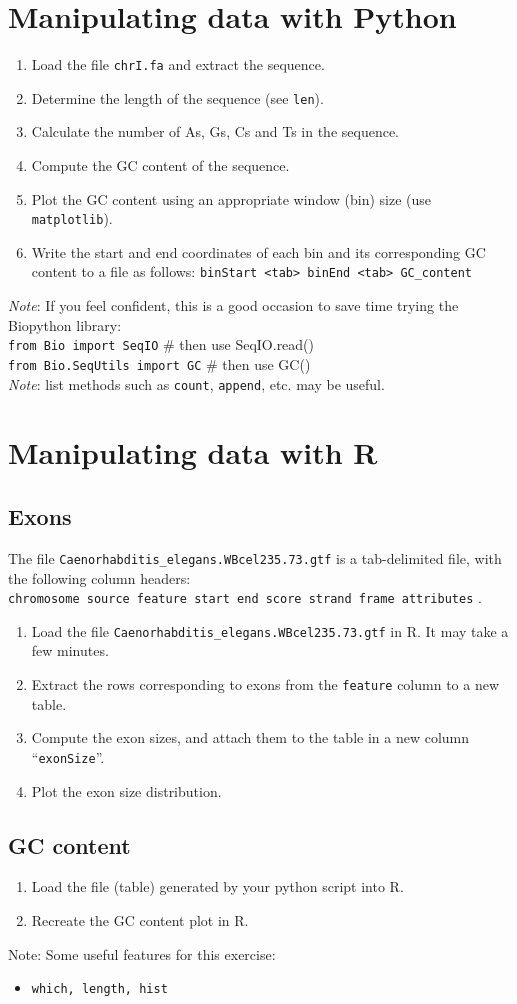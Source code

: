 \documentclass[a4paper,11pt]{article}
\begin{document}
\newpage

\section{Manipulating data with Python}
\begin{enumerate}
\item Load the file \texttt{chrI.fa} and extract the sequence.
\item Determine the length of the sequence (see \texttt{len}).
\item Calculate the number of As, Gs, Cs and Ts in the sequence.
\item Compute the GC content of the sequence.
\item Plot the GC content using an appropriate window (bin) size (use \texttt{matplotlib}).
\item Write the start and end coordinates of each bin and its corresponding GC content to a file as follows:
\texttt {binStart <tab> binEnd <tab> GC\_content}
\end{enumerate}
\textit{Note}: If you feel confident, this is a good occasion to save time trying the Biopython library: \\
\texttt{from Bio import SeqIO} \# then use SeqIO.read()\\
\texttt{from Bio.SeqUtils import GC} \# then use GC() \\
\textit{Note}: list methods such as \texttt{count}, \texttt{append}, etc. may be useful.


\section{Manipulating data with R}
\subsection{Exons}
The file \texttt{Caenorhabditis\_elegans.WBcel235.73.gtf} is a tab-delimited file, with the following column headers: \\
\texttt {chromosome source feature start end score strand frame attributes} .
\begin{enumerate}
\item Load the file \texttt{Caenorhabditis\_elegans.WBcel235.73.gtf} in R. It may take a few minutes.
\item Extract the rows corresponding to exons from the \texttt{feature} column to a new table.
\item Compute the exon sizes, and attach them to the table in a new column ``\texttt{exonSize}''.
\item Plot the exon size distribution.
\end{enumerate}

\subsection{GC content}
\begin{enumerate}
\item Load the file (table) generated by your python script into R.
\item Recreate the GC content plot in R.
\end{enumerate}
\noindent
Note: Some useful features for this exercise:
\begin{itemize}
\item \texttt{which, length, hist}
\end{itemize}
\end{document}
